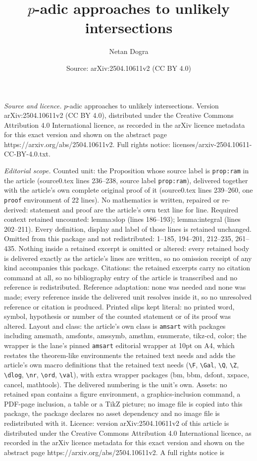 \documentclass[10pt,a4paper]{amsart}
\title[$p$-adic approaches to unlikely intersections]{$p$-adic approaches to unlikely intersections}
\author{Netan Dogra}
\date{Source: arXiv:2504.10611v2 (CC BY 4.0)}
\begin{document}
\maketitle

\noindent\emph{Source and licence.} $p$-adic approaches to unlikely intersections. Version arXiv:2504.10611v2 (CC BY 4.0), distributed under the Creative Commons Attribution 4.0 International licence, as recorded in the arXiv licence metadata for this exact version and shown on the abstract page https://arxiv.org/abs/2504.10611v2. Full rights notice: licenses/arxiv-2504.10611-CC-BY-4.0.txt.\par\smallskip

\noindent\textit{Editorial scope.} Counted unit: the Proposition whose source label is \texttt{prop:ram} in the article (source0.tex lines 236--238, source label \texttt{prop:ram}), delivered together with the article's own complete original proof of it (source0.tex lines 239--260, one \texttt{proof} environment of 22 lines). No mathematics is written, repaired or re-derived: statement and proof are the article's own text line for line. Required context retained uncounted: lemma:slop (lines 186--193); lemma:integral (lines 202--211). Every definition, display and label of those lines is retained unchanged. Omitted from this package and not redistributed: 1--185, 194--201, 212--235, 261--435. Nothing inside a retained excerpt is omitted or altered: every retained body is delivered exactly as the article's lines are written, so no omission receipt of any kind accompanies this package. Citations: the retained excerpts carry no citation command at all, so no bibliography entry of the article is transcribed and no reference is redistributed. Reference adaptation: none was needed and none was made; every reference inside the delivered unit resolves inside it, so no unresolved reference or citation is produced. Printed slips kept literal: no printed word, symbol, hypothesis or number of the counted statement or of its proof was altered. Layout and class: the article's own class is \texttt{amsart} with packages including amsmath, amsfonts, amssymb, amsthm, enumerate, tikz-cd, color; the wrapper is the lane's pinned \texttt{amsart} editorial wrapper at 10pt on A4, which restates the theorem-like environments the retained text needs and adds the article's own macro definitions that the retained text needs (\texttt{\textbackslash F}, \texttt{\textbackslash Gal}, \texttt{\textbackslash Q}, \texttt{\textbackslash Z}, \texttt{\textbackslash dlog}, \texttt{\textbackslash nr}, \texttt{\textbackslash ord}, \texttt{\textbackslash val}), with extra wrapper packages (bm, bbm, dsfont, xspace, cancel, mathtools). The delivered numbering is the unit's own. Assets: no retained span contains a figure environment, a graphics-inclusion command, a PDF-page inclusion, a table or a TikZ picture; no image file is copied into this package, the package declares no asset dependency and no image file is redistributed with it. Licence: version arXiv:2504.10611v2 of this article is distributed under the Creative Commons Attribution 4.0 International licence, as recorded in the arXiv licence metadata for this exact version and shown on the abstract page https://arxiv.org/abs/2504.10611v2. A full rights notice is 
\end{document}
